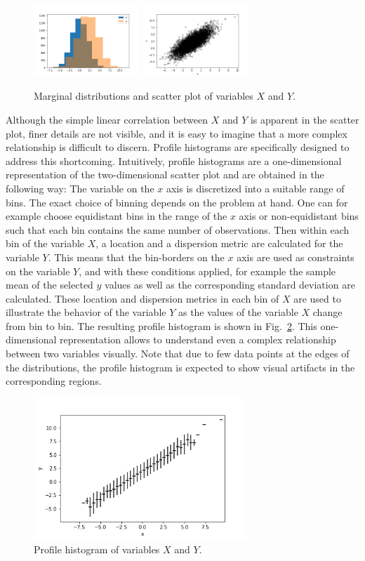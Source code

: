 \documentclass[BCOR=1mm, DIV=calc,10pt,
twoside=true,
twocolumn,
headings=normal]{scrartcl}
\newcommand{\fig}{Fig.~}
\begin{document}
\begin{figure}
\begin{center}
\includegraphics[width=4cm]{figs/marginal}
\includegraphics[width=4cm]{figs/scatter}
\caption{\label{fig:scatter} Marginal distributions and scatter plot of variables $X$ and $Y$.}
\end{center}
\end{figure}

Although the simple linear correlation between $X$ and $Y$ is apparent in the scatter plot, finer details are not visible, and it is easy to imagine that a more complex relationship is difficult to discern. Profile histograms are specifically designed to address this shortcoming. Intuitively, profile histograms are a one-dimensional representation of the two-dimensional scatter plot and are obtained  in the following way: The variable on the $x$ axis is discretized into a suitable range of bins. The exact choice of binning depends on the problem at hand. One can for example choose equidistant bins in the range of the $x$ axis or non-equidistant bins such that each bin contains the same number of observations. Then within each bin of the variable $X$, a location and a dispersion metric are calculated for the variable $Y$. This means that the bin-borders on the $x$ axis are used as constraints on the variable $Y$, and with these conditions applied, for example the sample mean of the selected $y$ values as well as the corresponding standard deviation are calculated. These location and dispersion metrics in each bin of $X$ are used to illustrate the behavior of the variable $Y$ as the values of the variable $X$ change from bin to bin. The resulting profile histogram is shown in \fig \ref{fig:profile}. This one-dimensional representation allows to understand even a complex relationship between two variables visually. Note that due to few data points at the edges of the distributions, the profile histogram is expected to show visual artifacts in the corresponding regions.

\begin{figure}
\begin{center}
\includegraphics[width=8cm]{figs/profile}
\caption{\label{fig:profile} Profile histogram of variables $X$ and $Y$.}
\end{center}
\end{figure}
\end{document}
